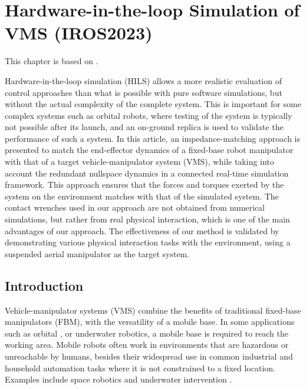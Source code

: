 \documentclass[../main.tex]{subfiles}
\begin{document}
\chapter{Hardware-in-the-loop Simulation of VMS (IROS2023)}

This chapter is based on \cite{das2023}.


Hardware-in-the-loop simulation (HILS) allows a more realistic evaluation of control approaches than what is possible with pure software simulations, but without the actual complexity of the complete system. This is important  for some complex systems such as orbital robots, where testing of the system is typically not possible after its launch, and an on-ground replica is used to validate the performance of such a system. In this article, an impedance-matching approach is presented to match the end-effector dynamics of a fixed-base robot manipulator with that of a target vehicle-manipulator system (VMS), while taking into account the redundant nullspace dynamics in a connected real-time simulation framework. This approach ensures that the forces and torques exerted by the system on the environment matches with that of the simulated system. The contact wrenches used in our approach are not obtained from numerical simulations, but rather from real physical interaction, which is one of the main advantages of our approach. The effectiveness of our method is validated by demonstrating various physical interaction tasks with the environment, using a suspended aerial manipulator as the target system.


\section{Introduction}
\label{sec:intro}
Vehicle-manipulator systems (VMS) combine the benefits of traditional fixed-base manipulators (FBM), with the versatility of a mobile base. In some applications such as orbital \cite{mishra2020}, or underwater \cite{Antonelli2018} robotics, a mobile base is required to reach the working area. Mobile robots often work in environments that are hazardous or unreachable by humans, besides their widespread use in common industrial and household automation tasks where it is not constrained to a fixed location. Examples include space robotics \cite{flores-abad2014} and underwater intervention \cite{simetti2020}.
\end{document}
